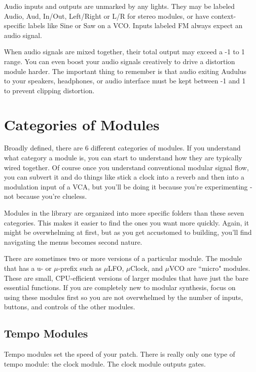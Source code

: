 \documentclass[11pt]{book}
\begin{document}
Audio inputs and outputs are unmarked by any lights. They may be labeled Audio, Aud, In/Out, Left/Right or L/R for stereo modules, or have context-specific labels like Sine or Saw on a VCO. Inputs labeled FM always expect an audio signal.

When audio signals are mixed together, their total output may exceed a -1 to 1 range. You can even boost your audio signals creatively to drive a distortion module harder. The important thing to remember is that audio exiting Audulus to your speakers, headphones, or audio interface must be kept between -1 and 1 to prevent clipping distortion. 

\section{Categories of Modules}

Broadly defined, there are 6 different categories of modules. If you understand what category a module is, you can start to understand how they are typically wired together. Of course once you understand conventional modular signal flow, you can subvert it and do things like stick a clock into a reverb and then into a modulation input of a VCA, but you'll be doing it because you're experimenting - not because you're clueless.

Modules in the library are organized into more specific folders than these seven categories. This makes it easier to find the ones you want more quickly. Again, it might be overwhelming at first, but as you get accustomed to building, you'll find navigating the menus becomes second nature.

There are sometimes two or more versions of a particular module. The module that has a u- or $\mu$-prefix such as $\mu$LFO, $\mu$Clock, and $\mu$VCO are ``micro" modules. These are small, CPU-efficient versions of larger modules that have just the bare essential functions. If you are completely new to modular synthesis, focus on using these modules first so you are not overwhelmed by the number of inputs, buttons, and controls of the other modules.

\subsection{Tempo Modules}

Tempo modules set the speed of your patch. There is really only one type of tempo module: the clock module. The clock module outputs gates.
\end{document}
